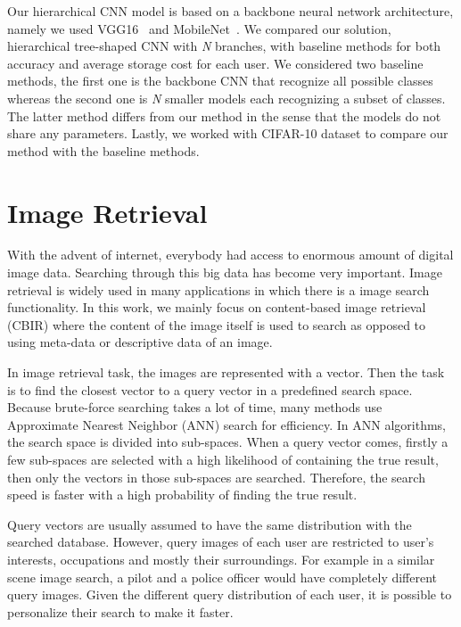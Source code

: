 Our hierarchical CNN model is based on a backbone neural network architecture, namely we used VGG16~\cite{simonyan2014very} and MobileNet~\cite{howard2017mobilenets}. 
We compared our solution, hierarchical tree-shaped CNN with \textit{N} branches, with baseline methods for both accuracy and average storage cost for each user. 
We considered two baseline methods, the first one is the backbone CNN that recognize all possible classes 
whereas the second one is \textit{N} smaller models each recognizing a subset of classes.
The latter method differs from our method in the sense that the models do not share any parameters. 
Lastly, we worked with CIFAR-10 dataset to compare our method with the baseline methods.


\section{Image Retrieval}

With the advent of internet, everybody had access to enormous amount of digital image data. 
Searching through this big data has become very important. 
Image retrieval is widely used in many applications 
in which there is a image search functionality. 
In this work, we mainly focus on content-based image retrieval (CBIR)
where the content of the image itself is used to search
as opposed to using meta-data or descriptive data of an image.

In image retrieval task, the images are represented with a vector.
Then the task is to find the closest vector to a query vector in a predefined search space. 
Because brute-force searching takes a lot of time, many methods use Approximate Nearest Neighbor (ANN) search for efficiency. 
In ANN algorithms, the search space is divided into sub-spaces. 
When a query vector comes, firstly a few sub-spaces are selected with a high likelihood of containing the true result, 
then only the vectors in those sub-spaces are searched.
Therefore, the search speed is faster with a high probability of finding the true result.

Query vectors are usually assumed to have the same distribution with the searched database. 
However, query images of each user are restricted to user's interests, occupations and mostly their surroundings.
For example in a similar scene image search, a pilot and a police officer would have completely different query images.
Given the different query distribution of each user, it is possible to personalize their search to make it faster.

